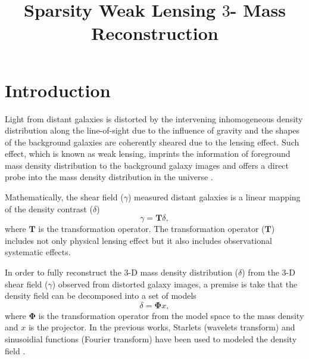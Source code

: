 \documentclass[twocolumn]{aastex62}
\begin{document}
\title{Sparsity Weak Lensing $3$- Mass Reconstruction}

\begin{abstract}

\end{abstract}

\section{Introduction}
Light from distant galaxies is distorted by the intervening inhomogeneous density distribution along the line-of-sight
due to the influence of gravity and the shapes of the background galaxies are coherently sheared due to the lensing effect.
Such effect, which is known as weak lensing, imprints the information of foreground mass density distribution to the
background galaxy images and offers a direct probe into the mass density distribution in the universe \citep[see][for recent 
reviews]{revKilbinger15,revRachel17}.

Mathematically, the shear field ($\gamma$) measured distant galaxies is a linear mapping of the density contrast ($\delta$)
\begin{equation}
 \gamma=\mathbf{T} \delta,
\end{equation}
where $\mathbf{T}$ is the transformation operator. The transformation operator ($\mathbf{T}$) includes not only physical lensing
effect but it also includes observational systematic effects.

In order to fully reconstruct the $3$-D mass density distribution ($\delta$) from the $3$-D shear field ($\gamma$) 
observed from distorted galaxy images, a premise is take that the density field can be decomposed into a set of models
\begin{equation}
 \delta= \mathbf{\Phi} x,
\end{equation}
where $\mathbf{\Phi}$ is the transformation operator from the model space to the mass density and $x$ is the projector. 
In the previous works, Starlets (wavelets transform) and sinusoidial functions (Fourier transform) have been used to 
modeled the density field . 
\end{document}
